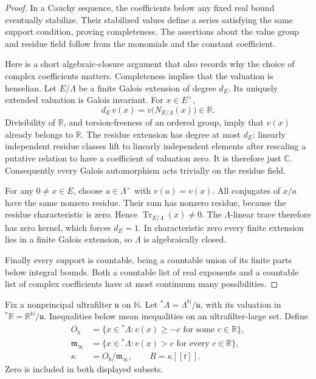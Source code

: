 \documentclass[11pt]{article}
\theoremstyle{definition}
\theoremstyle{remark}
\newcommand{\R}{\mathbb R}
\newcommand{\C}{\mathbb C}
\newcommand{\N}{\mathbb N}
\numberwithin{equation}{section}
\begin{document}
\begin{proof}
In a Cauchy sequence, the coefficients below any fixed real bound
eventually stabilize.  Their stabilized values define a series satisfying
the same support condition, proving completeness.  The assertions about
the value group and residue field follow from the monomials and the
constant coefficient.

Here is a short algebraic-closure argument that also records why the
choice of complex coefficients matters.  Completeness implies that the
valuation is henselian.  Let \(E/\Lambda\) be a finite Galois extension of
degree \(d_E\).  Its uniquely extended valuation is Galois invariant.
For \(x\in E^\times\),
\[
 d_E\,v(x)=v\bigl(N_{E/\Lambda}(x)\bigr)\in\R.
\]
Divisibility of \(\R\), and torsion-freeness of an ordered group, imply
that \(v(x)\) already belongs to \(\R\).  The residue extension has degree
at most \(d_E\): linearly independent residue classes lift to linearly
independent elements after rescaling a putative relation to have a
coefficient of valuation zero.  It is therefore just \(\C\).
Consequently every Galois automorphism acts trivially on the residue
field.

For any \(0\ne x\in E\), choose \(a\in\Lambda^\times\) with \(v(a)=v(x)\).
All conjugates of \(x/a\) have the same nonzero residue.  Their sum has
nonzero residue, because the residue characteristic is zero.  Hence
\(\operatorname{Tr}_{E/\Lambda}(x)\ne0\).  The \(\Lambda\)-linear trace
therefore has zero kernel, which forces \(d_E=1\).  In characteristic
zero every finite extension lies in a finite Galois extension, so
\(\Lambda\) is algebraically closed.

Finally every support is countable, being a countable union of its finite
parts below integral bounds.  Both a countable list of real exponents and
a countable list of complex coefficients have at most continuum many
possibilities.
\end{proof}

Fix a nonprincipal ultrafilter \(\mathfrak u\) on \(\N\).  Let
\({}^*\Lambda=\Lambda^{\N}/\mathfrak u\), with its valuation in
\({}^*\R=\R^{\N}/\mathfrak u\).  Inequalities below mean inequalities on
an ultrafilter-large set.  Define
\begin{align}
 O_b&=\{x\in{}^*\Lambda:v(x)\ge-c
                         \text{ for some }c\in\R\},\nonumber\\
 \mathfrak m_\infty&=\{x\in{}^*\Lambda:v(x)>c
                         \text{ for every }c\in\R\},\nonumber\\
 \kappa&=O_b/\mathfrak m_\infty,\qquad R=\kappa[[t]].
 \label{cat:coefficient-rings}
\end{align}
Zero is included in both displayed subsets.
\end{document}

